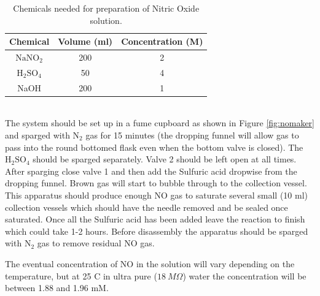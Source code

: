 \begin{table}[tbp]
\begin{center}
\begin{tabular}{ccc}
\toprule
\textbf{Chemical} & \textbf{Volume (ml)} & \textbf{Concentration (M)} \\
\midrule
$\textrm{NaNO}_2$ & 200 & 2 \\
$\textrm{H}_2\textrm{SO}_4$ & 50 & 4 \\
NaOH & 200 & 1 \\
\bottomrule
\end{tabular} 
\end{center}
\caption{Chemicals needed for preparation of Nitric Oxide solution.
\label{tab:nomakerchem}}
\end{table}\\
The system should be set up in a fume cupboard as shown in Figure \ref{fig:nomaker} and sparged with $\textrm{N}_2$ gas for 15 minutes (the dropping funnel will allow gas to pass into the round bottomed flask even when the bottom valve is closed). The $\textrm{H}_2\textrm{SO}_4$ should be sparged separately. Valve 2 should be left open at all times. After sparging close valve 1 and then add the Sulfuric acid dropwise from the dropping funnel. Brown gas will start to bubble through to the collection vessel. This apparatus should produce enough NO gas to saturate several small (10 ml) collection vessels which should have the needle removed and be sealed once saturated. Once all the Sulfuric acid has been added leave the reaction to finish which could take 1-2 hours. Before disassembly the apparatus should be sparged with $\textrm{N}_2$ gas to remove residual NO gas.

The eventual concentration of NO in the solution will vary depending on the temperature, but at 25 \textdegree{}C in ultra pure ($18~M\Omega$) water the concentration will be between 1.88 and 1.96 mM\cite{Aga2008,Cole2008}.